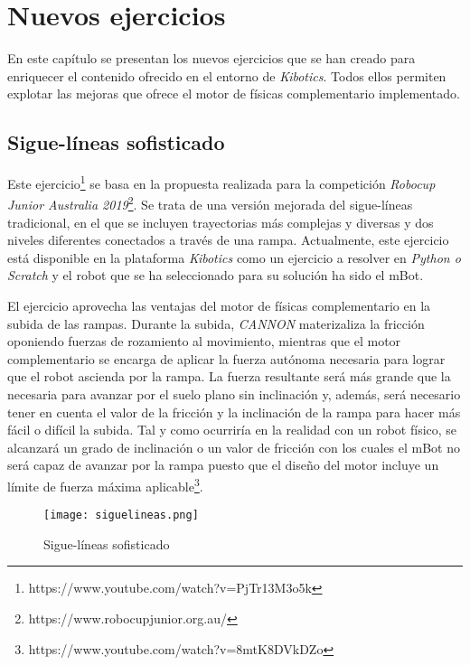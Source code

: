 \chapter{Nuevos ejercicios}
\label{chap:nuevos_ejercicios} 
En este capítulo se presentan los nuevos ejercicios que se han creado para enriquecer el contenido ofrecido en el entorno de \textit{Kibotics}. Todos ellos permiten explotar las mejoras que ofrece el motor de físicas complementario implementado.

\section{Sigue-líneas sofisticado}
Este ejercicio\footnote{https://www.youtube.com/watch?v=PjTr13M3o5k} se basa en la propuesta realizada para la competición \textit{Robocup Junior Australia 2019}\footnote{https://www.robocupjunior.org.au/}. Se trata de una versión mejorada del sigue-líneas tradicional, en el que se incluyen trayectorias más complejas y diversas y dos niveles diferentes conectados a través de una rampa. Actualmente, este ejercicio está disponible en la plataforma \textit{Kibotics} como un ejercicio a resolver en \textit{Python o Scratch} y el robot que se ha seleccionado para su solución ha sido el mBot. \newline 

El ejercicio  aprovecha las ventajas del motor de físicas complementario en la subida de las rampas. Durante la subida, \textit{CANNON} materizaliza la fricción oponiendo fuerzas de rozamiento al movimiento, mientras que el motor complementario se encarga de aplicar la fuerza autónoma necesaria para lograr que el robot ascienda por la rampa. La fuerza resultante será más grande que la necesaria para avanzar por el suelo plano sin inclinación y, además, será necesario tener en cuenta el valor de la fricción y la inclinación de la rampa para hacer más fácil o difícil la subida. Tal y como ocurriría en la realidad con un robot físico, se alcanzará un grado de inclinación o un valor de fricción con los cuales el mBot no será capaz de avanzar por la rampa puesto que el diseño del motor incluye un límite de fuerza máxima aplicable\footnote{https://www.youtube.com/watch?v=8mtK8DVkDZo}.


\begin{figure}[h!]
    \centering
    \texttt{[image: siguelineas.png]}
    \caption{Sigue-líneas sofisticado}
    \label{fig:Sigue-líneas sofisticado}
\end{figure}


